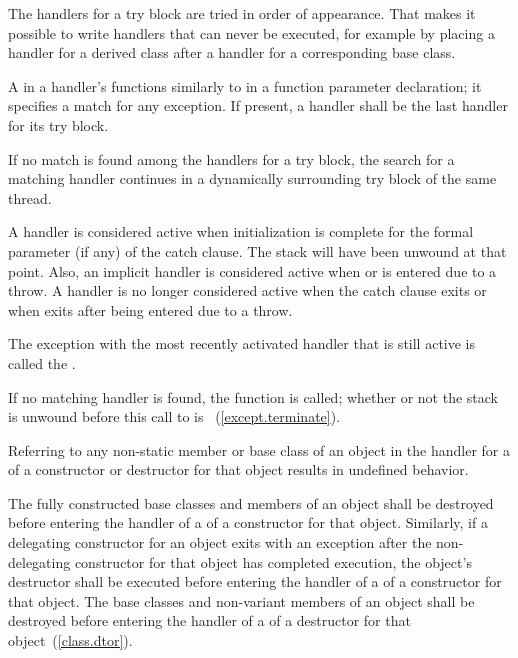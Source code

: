 \pnum
The handlers for a try block are tried in order of appearance.
That makes it possible to write handlers that can never be
executed, for example by placing a handler for a derived class after
a handler for a corresponding base class.

\pnum
A
in a handler's
functions similarly to
in a function parameter declaration;
it specifies a match for any exception.
If present, a
handler shall be the last handler for its try block.

\pnum
If no match is found among the handlers for a try block,
the search for a matching
handler continues in a dynamically surrounding try block
of the same thread.

\pnum
A handler is considered active when initialization is complete for
the formal parameter (if any) of the catch clause.
\enternote
The stack will have been unwound at that point.
\exitnote
Also, an implicit handler is considered active when
or
is entered due to a throw. A handler is no longer considered active when the
catch clause exits or when
exits after being entered due to a throw.

\pnum
The exception with the most recently activated handler that is
still active is called the
.

\pnum
If no matching handler is found,
the function
is called;
whether or not the stack is unwound before this call to
is ~(\ref{except.terminate}).

\pnum
Referring to any non-static member or base class of an object
in the handler for a
of a constructor or destructor for that object results in undefined behavior.

\pnum
The fully constructed base classes and members of an object shall
be destroyed before entering the handler of a
of a constructor for that object.
Similarly, if a delegating constructor for an object exits
with an exception after the non-delegating constructor for that object
has completed execution, the object's destructor shall be executed before
entering the handler of a  of a
constructor for that object. The base classes and non-variant members of an object shall be destroyed before entering the handler of a  of a destructor for that object~(\ref{class.dtor}).


